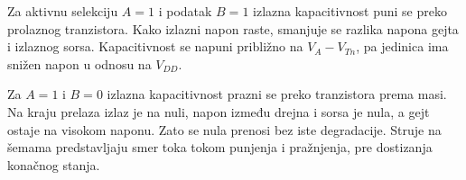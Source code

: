 Za aktivnu selekciju $A=1$ i podatak $B=1$ izlazna kapacitivnost puni se preko prolaznog tranzistora. Kako izlazni napon raste, smanjuje se razlika napona gejta i izlaznog sorsa. Kapacitivnost se napuni približno na $V_A-V_{Tn}$, pa jedinica ima snižen napon u odnosu na $V_{DD}$.

Za $A=1$ i $B=0$ izlazna kapacitivnost prazni se preko tranzistora prema masi. Na kraju prelaza izlaz je na nuli, napon između drejna i sorsa je nula, a gejt ostaje na visokom naponu. Zato se nula prenosi bez iste degradacije. Struje na šemama predstavljaju smer toka tokom punjenja i pražnjenja, pre dostizanja konačnog stanja.
